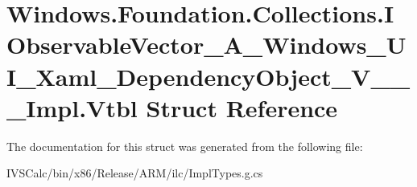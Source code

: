 \hypertarget{struct_windows_1_1_foundation_1_1_collections_1_1_i_observable_vector___a___windows___u_i___xaml180991e8c9abe343f7d84ebc161aa1d7}{}\section{Windows.\+Foundation.\+Collections.\+I\+Observable\+Vector\+\_\+\+A\+\_\+\+Windows\+\_\+\+U\+I\+\_\+\+Xaml\+\_\+\+Dependency\+Object\+\_\+\+V\+\_\+\+\_\+\+\_\+\+Impl.\+Vtbl Struct Reference}
\label{struct_windows_1_1_foundation_1_1_collections_1_1_i_observable_vector___a___windows___u_i___xaml180991e8c9abe343f7d84ebc161aa1d7}


The documentation for this struct was generated from the following file\+:\begin{DoxyCompactItemize}
\item 
I\+V\+S\+Calc/bin/x86/\+Release/\+A\+R\+M/ilc/Impl\+Types.\+g.\+cs\end{DoxyCompactItemize}
